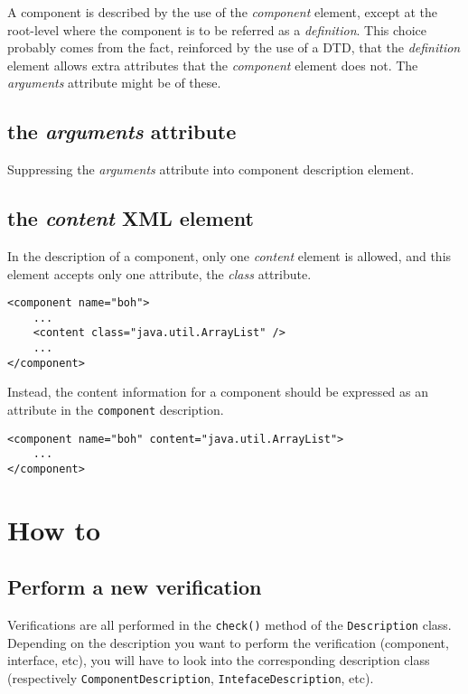 \documentclass{article}
\newcommand{\code}[1]{\texttt{#1}}
\newcommand{\xml}[1]{\textsl{#1}}
\begin{document}
A component is described by the use of the \xml{component} element, except at the root-level
where the component is to be referred as a  \xml{definition}. This choice probably comes
from the fact, reinforced by the use of a DTD, that the \xml{definition} element allows
extra attributes that the \xml{component} element does not. The \xml{arguments}  
attribute might be of these.


\subsection{the \xml{arguments} attribute}

Suppressing the \xml{arguments} attribute into component description element.

\subsection{the \xml{content} XML element}

In the description of a component, only one \xml{content} element is allowed, and this element accepts
only one attribute, the \xml{class} attribute. 

\begin{lstlisting}
<component name="boh">
	...
	<content class="java.util.ArrayList" />
	...
</component>
\end{lstlisting}


Instead, the content information for a component should be expressed as
an attribute in the \texttt{component} description.

\begin{lstlisting}
<component name="boh" content="java.util.ArrayList">
	...
</component>
\end{lstlisting}

\section{How to}

\subsection{Perform a new verification}

Verifications are all performed in the \code{check()} method of the \code{Description}
class. Depending on the description you want to perform the verification (component, interface, etc),
you will have to look into the corresponding description class (respectively \code{ComponentDescription},
\code{IntefaceDescription}, etc).
\end{document}
